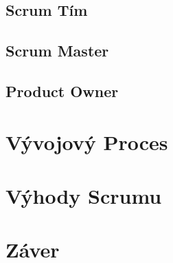 \documentclass[10pt,twoside,slovak,a4paper]{article}
\begin{document}
\subsection{Scrum Tím}

\subsection{Scrum Master}

\subsection{Product Owner}

\section{Vývojový Proces} \label{proces}

\section{Výhody Scrumu} \label{proces}

\section{Záver} \label{zaver}







\end{document}
